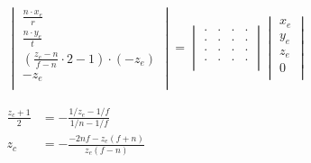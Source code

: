 \documentclass[a4paper,12pt]{article}
\begin{document}
\begin{center}
    \begin{math}
        \begin{aligned}
            \begin{vmatrix}
                \frac{n \cdot x_e}{ r}                     \\
                \frac{n \cdot y_e}{ t}                     \\
                (\frac{z_e-n}{f-n} \cdot 2 -1)\cdot (-z_e) \\
                -z_e                                       \\
            \end{vmatrix}
            =
            \begin{vmatrix}
                \cdot & \cdot & \cdot & \cdot \\
                \cdot & \cdot & \cdot & \cdot \\
                \cdot & \cdot & \cdot & \cdot \\
                \cdot & \cdot & \cdot & \cdot \\
            \end{vmatrix}
            \begin{vmatrix}
                x_e \\
                y_e \\
                z_e \\
                0   \\
            \end{vmatrix}
        \end{aligned}
    \end{math}
\end{center}
\par{}
\begin{center}
    \begin{math}
        \begin{aligned}
            \frac{z_c+1}{2} & =-\frac{1/z_e-1/f}{1/n-1/f}      \\
            z_c             & =-\frac{-2nf-z_e(f+n)}{z_e(f-n)} \\
        \end{aligned}
    \end{math}
\end{center}
\end{document}
